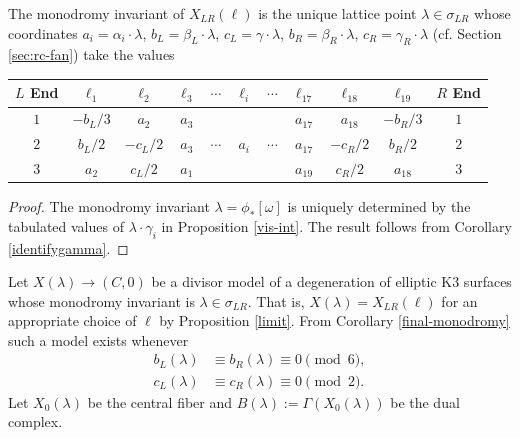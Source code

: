 \documentclass[table,x11names]{amsart}
\begin{document}
\begin{corollary}\label{final-monodromy} The monodromy invariant of $X_{LR}(\ell)$ is the unique
  lattice point $\lambda\in \sigma_{LR}$ whose coordinates
  $a_i=\alpha_i\cdot \lambda$, $b_L=\beta_L\cdot \lambda$, $c_L=\gamma\cdot \lambda$,
  $b_R=\beta_R\cdot \lambda$, $c_R=\gamma_R\cdot \lambda$ 
(cf. Section \ref{sec:rc-fan}) take the values

\begin{centering}

  \begin{tabular}[htp]{c | c c c | c c c | c c c | c }
    $L$ End &$\ell_1$ &$\ell_2$ &$\ell_3$ & $\cdots$ & $\ell_i$ & $\cdots$ & $\ell_{17}$ & $\ell_{18}$ & $\ell_{19}$ & $R$ End  \\
    \hline
  $1$  &$-b_L/3$ &$a_2$ &$a_3$ & & & & $a_{17}$ & $a_{18}$ & $-b_R/3$ & $1$ \\
  $2$  &$b_L/2$ &$-c_L/2$ &$a_3$ & $\cdots$ & $a_i$ & $\cdots$ & $a_{17}$ & $-c_R/2$ & $b_R/2$ & $2$ \\
  $3$ &$a_2$ &$c_L/2$ & $a_1$ & & & & $a_{19}$ & $c_R/2$ & $a_{18}$ & $3$
    \end{tabular}
  
  \end{centering}
    
\end{corollary}

 \begin{proof} The monodromy invariant $\lambda = \phi_*[\omega]$ is uniquely determined
 by the tabulated values of $\lambda\cdot \gamma_i$ in Proposition \ref{vis-int}. 
 The result follows from Corollary \ref{identifygamma}.
 \end{proof}
 
 \begin{definition}\label{monodivisor} Let $X(\lambda)\to (C,0)$ be a divisor model
   of a degeneration of elliptic K3 surfaces whose monodromy invariant
 is $\lambda\in \sigma_{LR}$. That is, $X(\lambda)=X_{LR}(\ell)$ for an appropriate choice of $\ell$ by
 Proposition \ref{limit}.
From Corollary \ref{final-monodromy} such a model exists
whenever \begin{align*} b_L(\lambda)& \equiv b_R(\lambda)\equiv 0\pmod 6, \\
c_L(\lambda)&\equiv c_R(\lambda)\equiv 0\pmod 2.\end{align*}
Let $X_0(\lambda)$ be the central fiber
and $B(\lambda):=\Gamma(X_0(\lambda))$
be the dual complex.
 \end{definition}
  
\end{document}
